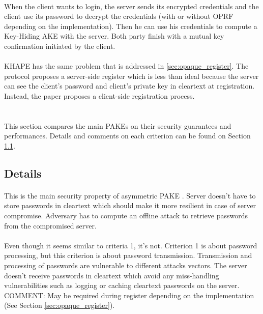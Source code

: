 ﻿\documentclass[../report.tex]{subfiles}
\begin{document}
\paragraph{}
When the client wants to login, the server sends its encrypted credentials and the client use its password to decrypt the credentials (with or without OPRF depending on the implementation). Then he can use his credentials to compute a Key-Hiding AKE with the server.
Both party finish with a mutual key confirmation initiated by the client.

\paragraph{}
KHAPE has the same problem that is addressed in \ref{sec:opaque_register}.
The protocol proposes a server-side register which is less than ideal because the server can see the client's password and client's private key in cleartext at registration.
Instead, the paper proposes a client-side registration process.


\section{}
This section compares the main PAKEs on their security guarantees and performances. Details and comments on each criterion can be found on Section \ref{sec:comparison_details}.
 
\subsection{Details} \label{sec:comparison_details}

\paragraph{}
This is the main security property of asymmetric PAKE \cite{aPAKE_Formalized}. Server doesn't have to store passwords in cleartext which should make it more resilient in case of server compromise. Adversary has to compute an offline attack to retrieve passwords from the compromised server.
\paragraph{}
Even though it seems similar to criteria 1, it's not. Criterion 1 is about password processing, but this criterion is about password transmission. Transmission and processing of passwords are vulnerable to different attacks vectors.
The server doesn't receive passwords in cleartext which avoid any miss-handling vulnerabilities such as logging or caching cleartext passwords on the server.
COMMENT: May be required during register depending on the implementation (See Section \ref{sec:opaque_register}).
\end{document}
